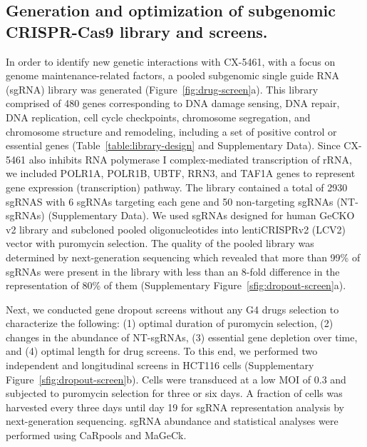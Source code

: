 
\subsection{Generation and optimization of subgenomic CRISPR-Cas9 library and screens.}
In order to identify new genetic interactions with CX-5461, with a focus on genome maintenance-related factors, a pooled subgenomic single guide RNA (sgRNA) library was generated (Figure~\ref{fig:drug-screen}a). This library comprised of 480 genes corresponding to DNA damage sensing, DNA repair, DNA replication, cell cycle checkpoints, chromosome segregation, and chromosome structure and remodeling, including a set of positive control or essential genes (Table~\ref{table:library-design} and Supplementary Data)\cite{Croft2014,Fabregat2016,Espeseth2011,Kanehisa2000}. Since CX-5461 also inhibits RNA polymerase I complex-mediated transcription of rRNA, we included POLR1A, POLR1B, UBTF, RRN3, and TAF1A genes to represent gene expression (transcription) pathway. The library contained a total of 2930 sgRNAS with 6 sgRNAs targeting each gene and 50 non-targeting sgRNAs (NT-sgRNAs)  (Supplementary Data). We used sgRNAs designed for human GeCKO v2 library and subcloned pooled oligonucleotides into lentiCRISPRv2 (LCV2) vector with puromycin selection\cite{Sanjana2014}. The quality of the pooled library was determined by next-generation sequencing which revealed that more than 99\% of sgRNAs were present in the library with less than an 8-fold difference in the representation of 80\% of them (Supplementary Figure~\ref{sfig:dropout-screen}a). 

Next, we conducted gene dropout screens without any G4 drugs selection to characterize the following: (1) optimal duration of puromycin selection, (2) changes in the abundance of NT-sgRNAs, (3) essential gene depletion over time, and (4) optimal length for drug screens. 
To this end, we performed two independent and longitudinal screens in HCT116 cells (Supplementary Figure~\ref{sfig:dropout-screen}b). 
Cells were transduced at a low MOI of 0.3 and subjected to puromycin selection for three or six days. A fraction of cells was harvested every three days until day 19 for sgRNA representation analysis by next-generation sequencing. 
sgRNA abundance and statistical analyses were performed using CaRpools and MaGeCk\cite{Winter2016,Li2014}.

